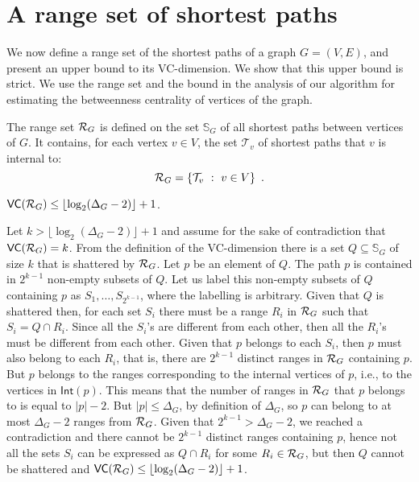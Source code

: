 \section{A range set of shortest paths}\label{sec:rangeset}
We now define a range set of the shortest paths of a graph $G=(V,E)$, and present 
an upper bound to its VC-dimension. \XXX We show that this upper bound is strict. We
use the range set and the bound in the analysis of our algorithm for estimating
the betweenness centrality of vertices of the graph.

The range set $\mathcal{R}_G$ is defined on the set $\mathbb{S}_G$ of all shortest
paths between vertices of $G$. It contains, for each vertex $v\in V$, the set
$\mathcal{T}_v$ of shortest paths that $v$ is internal to:
\[
\mathcal{R}_G = \{\mathcal{T}_v ~:~ v\in V\}\enspace.
\]

\begin{lemma}\label{lem:vcdimuppbound}
  $\mathsf{VC}(\mathcal{R}_G)\le\lfloor\log_2(\Delta_G-2)\rfloor+1$.
\end{lemma}

\begin{IEEEproof}
Let $k>\lfloor\log_2(\Delta_G-2)\rfloor+1$ and assume for the sake of contradiction
that $\mathsf{VC}(\mathcal{R}_G)=k$. From the definition of the VC-dimension there is a set
$Q\subseteq\mathbb{S}_G$ of size $k$ that is shattered by $\mathcal{R}_G$. Let $p$ be
an element of $Q$. The path $p$ is contained in $2^{k-1}$ non-empty subsets of
$Q$. Let us label this non-empty subsets of $Q$ containing $p$ as
$S_1,\dotsc,S_{2^{k-1}}$, where the labelling is arbitrary.
Given that $Q$ is shattered then, for each set $S_i$ there must be a range $R_i$ in
$\mathcal{R}_G$ such that $S_i=Q\cap R_i$. Since all the $S_i$'s are
different from each other, then all the $R_i$'s must be different from each
other. Given that $p$ belongs to each $S_i$, then $p$ must also belong to each
$R_i$, that is, there are $2^{k-1}$ distinct ranges in $\mathcal{R}_G$ containing
$p$. But $p$ belongs to the ranges corresponding to the internal vertices of
$p$, i.e., to the vertices in $\mathsf{Int}(p)$. This means that the number of ranges
in $\mathcal{R}_G$ that $p$ belongs to is equal to $|p|-2$. But $|p|\le\Delta_G$, by definition of $\Delta_G$, so $p$
can belong to at most $\Delta_G-2$ ranges from $\mathcal{R}_G$. Given that
$2^{k-1}>\Delta_G-2$, we reached a contradiction and there cannot be $2^{k-1}$
distinct ranges containing $p$, hence not all the sets $S_i$ can be expressed as
$Q\cap R_i$ for some $R_i\in\mathcal{R}_G$, but then $Q$ cannot be shattered and
$\mathsf{VC}(\mathcal{R}_G)\le\lfloor\log_2(\Delta_G-2)\rfloor+1$.%
\end{IEEEproof}

